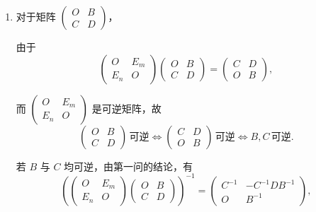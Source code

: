 \documentclass[12pt,fontset=fandol]{ctexart}
\begin{document}
\begin{solve}
\begin{enumerate}
                \item 对于矩阵 $\begin{pmatrix}
                        O & B \\ C & D
                    \end{pmatrix}$，

                    由于
                    \[
                        \begin{pmatrix}
                            O & E_m \\ E_n & O
                        \end{pmatrix} \begin{pmatrix}
                            O & B \\ C & D
                        \end{pmatrix} = \begin{pmatrix}
                            C & D \\ O & B
                        \end{pmatrix},
                    \]

                    而 $\begin{pmatrix} O & E_m \\ E_n & O \end{pmatrix}$ 是可逆矩阵，故
                    \[
                        \begin{pmatrix}
                            O & B \\ C & D
                        \end{pmatrix} \, \text{可逆}
                        \iff \begin{pmatrix}
                            C & D \\ O & B
                        \end{pmatrix} \, \text{可逆}
                        \iff B, C \, \text{可逆}.
                    \]

                    若 $B$ 与 $C$ 均可逆，由第一问的结论，有
                    \[
                        \left( \begin{pmatrix}
                            O & E_m \\ E_n & O
                        \end{pmatrix} \begin{pmatrix}
                            O & B \\ C & D
                        \end{pmatrix} \right)^{-1} = \begin{pmatrix}
                            C^{-1} & -C^{-1}DB^{-1} \\ O & B^{-1}
                        \end{pmatrix},
                    \]


\end{enumerate}
\end{solve}
\end{document}
